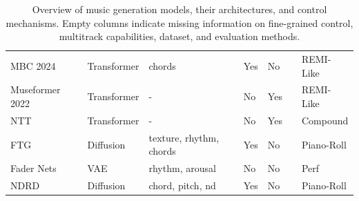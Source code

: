 \begin{table}[H]
\begin{tabular}{|l|l|l|l|l|l|l|}
        MBC 2024 \cite{Shu_Xu_Musebarcontrol_2024} & Transformer & chords & Yes & No & \cite{Wang_Chen_pop90_dataset} & REMI-Like\\
        Museformer 2022 \cite{Yu_Lu_Wang_Hu_Tan_Ye_Zhang_museformer_2022} & Transformer & - & No & Yes & \cite{Raffel_2016} & REMI-Like\\
        NTT \cite{Ryu_Dong_nested_2024} & Transformer & - & No  & Yes & \cite{Raffel_2016} \cite{Wang_Chen_pop90_dataset} \cite{Crestel_OrchestralDataset} & Compound\\
        FTG \cite{Zhu_Liu_Jiang_Zheng_texture_2024} & Diffusion & texture, rhythm, chords & Yes & No & \cite{Wang_Chen_pop90_dataset} & Piano-Roll \\
        Fader Nets & VAE & rhythm, arousal & No & No & \cite{hawthorne2018maestro} & Perf \\
        NDRD \cite{Huang_rule_diffusion_2024} & Diffusion & chord, pitch, nd & Yes & No & \cite{hawthorne2018maestro} \cite{Wang_Chen_pop90_dataset} & Piano-Roll \\
        \hline
    \end{tabular}
    \caption{Overview of music generation models, their architectures, and control mechanisms. Empty columns indicate missing information on fine-grained control, multitrack capabilities, dataset, and evaluation methods.}
    \label{tab:music_models}
\end{table}

